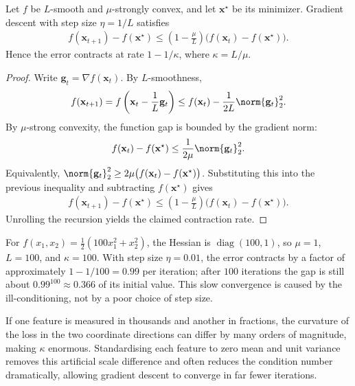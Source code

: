 \documentclass[a4paper, 12pt]{book}
\begin{document}
\begin{proposition}
    Let $f$ be $L$-smooth and $\mu$-strongly convex, and let
    $\mathbf{x}^\star$ be its minimizer. Gradient descent with step size
    $\eta=1/L$ satisfies
    \begin{align}
        f(\mathbf{x}_{t+1})-f(\mathbf{x}^\star)
        \leq \left(1-\frac{\mu}{L}\right)
        \big(f(\mathbf{x}_t)-f(\mathbf{x}^\star)\big).
    \end{align}
    Hence the error contracts at rate $1-1/\kappa$, where $\kappa=L/\mu$.
\end{proposition}
\begin{proof}
    Write $\mathbf{g}_t=\nabla f(\mathbf{x}_t)$. By $L$-smoothness,
    \begin{align}
        f(\mathbf{x}_{t+1})
        = f\left(\mathbf{x}_t-\frac1L\mathbf{g}_t\right)
        \leq f(\mathbf{x}_t)-\frac{1}{2L}\norm{\mathbf{g}_t}_2^2.
    \end{align}
    By $\mu$-strong convexity, the function gap is bounded by the gradient norm:
    \begin{align}
        f(\mathbf{x}_t)-f(\mathbf{x}^\star)
        \leq \frac{1}{2\mu}\norm{\mathbf{g}_t}_2^2.
    \end{align}
    Equivalently, $\norm{\mathbf{g}_t}_2^2\geq
    2\mu\big(f(\mathbf{x}_t)-f(\mathbf{x}^\star)\big)$. Substituting this into the
    previous inequality and subtracting $f(\mathbf{x}^\star)$ gives
    \begin{align}
        f(\mathbf{x}_{t+1})-f(\mathbf{x}^\star)
        \leq \left(1-\frac{\mu}{L}\right)
        \big(f(\mathbf{x}_t)-f(\mathbf{x}^\star)\big).
    \end{align}
    Unrolling the recursion yields the claimed contraction rate.
\end{proof}

\begin{example}
    For $f(x_1,x_2)=\frac12(100x_1^2+x_2^2)$, the Hessian is
    $\operatorname{diag}(100,1)$, so $\mu=1$, $L=100$, and $\kappa=100$. With step
    size $\eta=0.01$, the error contracts by a factor of approximately
    $1-1/100=0.99$ per iteration; after $100$ iterations the gap is still about
    $0.99^{100}\approx0.366$ of its initial value. This slow convergence is caused by
    the ill-conditioning, not by a poor choice of step size.
\end{example}

\begin{example}
    If one feature is measured in thousands and another in fractions, the curvature
    of the loss in the two coordinate directions can differ by many orders of
    magnitude, making $\kappa$ enormous. Standardising each feature to zero mean and
    unit variance removes this artificial scale difference and often reduces the
    condition number dramatically, allowing gradient descent to converge in far fewer
    iterations.
\end{example}
\end{document}

